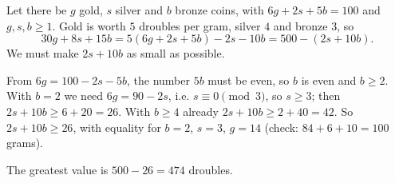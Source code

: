 Let there be $g$ gold, $s$ silver and $b$ bronze coins, with $6g+2s+5b=100$ and $g,s,b\ge1$. Gold is worth $5$ droubles per gram, silver $4$ and bronze $3$, so
\[
30g+8s+15b=5(6g+2s+5b)-2s-10b=500-(2s+10b).
\]
We must make $2s+10b$ as small as possible.

From $6g=100-2s-5b$, the number $5b$ must be even, so $b$ is even and $b\ge2$. With $b=2$ we need $6g=90-2s$, i.e. $s\equiv0\pmod3$, so $s\ge3$; then $2s+10b\ge6+20=26$. With $b\ge4$ already $2s+10b\ge2+40=42$. So $2s+10b\ge26$, with equality for $b=2$, $s=3$, $g=14$ (check: $84+6+10=100$ grams).

The greatest value is $500-26=\boxed{474}$ droubles.
